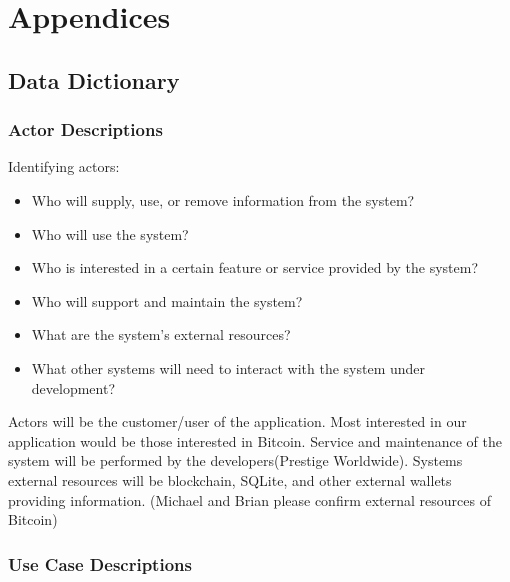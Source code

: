 \renewcommand\thefigure{\thesection.\arabic{figure}}   

\clearpage
\section{Appendices}
  \subsection{Data Dictionary}
    \subsubsection{Actor Descriptions}

    
Identifying actors:\\
\begin{itemize}
  \item Who will supply, use, or remove information from the system?
  \item Who will use the system?
  \item Who is interested in a certain feature or service provided by the system?
  \item Who will support and maintain the system?
  \item What are the system's external resources?
  \item What other systems will need to interact with the system under development?
\end{itemize}

Actors will be the customer/user of the application.  Most interested in our application would be those interested in Bitcoin. Service and maintenance of the system will be performed by the developers(Prestige Worldwide). Systems external resources will be blockchain, SQLite, and other external wallets providing information. (Michael and Brian please confirm external resources of Bitcoin)

  \subsubsection{Use Case Descriptions}


